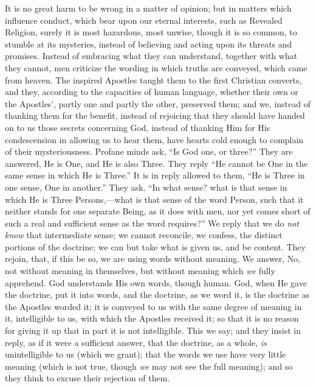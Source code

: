It is no great harm to be wrong in a matter of opinion; but in
matters which influence conduct, which bear upon our eternal
interests, such as Revealed Religion, surely it is most hazardous,
most unwise, though it is so common, to stumble at its mysteries,
instead of believing and acting upon its threats and promises. Instead
of embracing what they can understand, together with what they cannot,
men criticize the wording in which truths are conveyed, which came
from heaven. The inspired Apostles taught them to the first Christian
converts, and they, according to the capacities of human language,
whether their own or the Apostles', partly one and partly the other,
preserved them; and we, instead of thanking them for the benefit,
instead of rejoicing that they should have handed on to us those
secrets concerning God, instead of thanking Him for His condescension
in allowing us to hear them, have hearts cold enough to complain of
their mysteriousness. Profane minds ask, ``Is God one, or
three?'' They are answered, He is One, and He is also Three. They
reply ``He cannot be One in the same sense in which He is
Three.'' It is in reply allowed to them, ``He is Three in one
sense, One in another.'' They ask, ``In what sense? what is
that sense in which He is Three Persons,—what is that sense of the
word Person, such that it neither stands for one separate Being, as it
does with men, nor yet comes short of such a real and sufficient sense
as the word requires?'' We reply that we do \emph{not know} that
intermediate sense; we cannot reconcile, we confess, the distinct
portions of the doctrine; we can but take what is given us, and be
content. They rejoin, that, if this be so, we are using words without
meaning. We answer, No, not without meaning in themselves, but without
meaning which \emph{we} fully apprehend. God understands His own
words, though human. God, when He gave the doctrine, put it into
words, and the doctrine, as we word it, is the doctrine as the
Apostles worded it; it is conveyed to us with the same degree of
meaning in it, intelligible to us, with which the Apostles received
it; so that it is no reason for giving it up that in part it is not
intelligible. This we say; and they insist in reply, as if it were a
sufficient answer, that the doctrine, as a whole, \emph{is}
unintelligible to us (which we grant); that the words we use have very
little meaning (which is not true, though \emph{we} may not see the
full meaning); and so they think to excuse their rejection of them.

